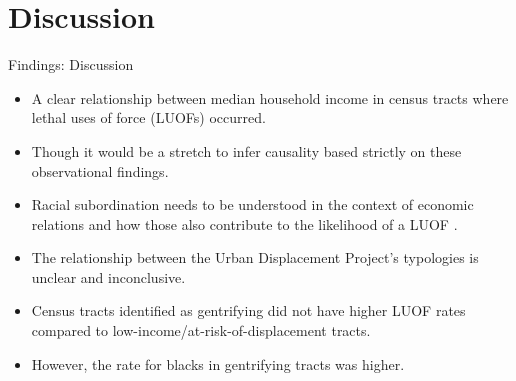 \documentclass{beamer}
\begin{document}
\section{Discussion}
\begin{frame}{Findings: Discussion}
	\begin{itemize}
	\item A clear relationship between median household income in census tracts where lethal uses of force (LUOFs) occurred.
	\item Though it would be a stretch to infer causality based strictly on these observational findings.
	\item Racial subordination needs to be understood in the context of economic relations and how those also contribute to the likelihood of a LUOF \parencite{johnsonAfterwordBaltimorePolicing2016, wacquantClassRaceHyperincarceration2010}.
	\item The relationship between the Urban Displacement Project’s typologies is unclear and inconclusive.
	\item Census tracts identified as gentrifying did not have higher LUOF rates compared to low-income/at-risk-of-displacement tracts.
	\item However, the rate for blacks in gentrifying tracts was higher.
	\end{itemize}
	\nocite{feldmanPoliceRelatedDeathsNeighborhood2019}
	\nocite{feldmanPoliceKillingsUS2020}
\end{frame}



\end{document}
